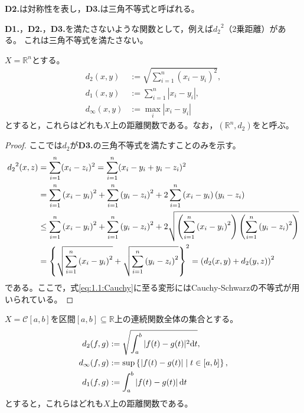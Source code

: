 \documentclass[uplatex]{jsarticle}
\begin{document}
{\bf D2.}は対称性を表し，{\bf D3.}は三角不等式と呼ばれる。

{\bf D1.}，{\bf D2.}，{\bf D3.}を満たさないような関数として，例えば${d_{2}}^{2}$（2乗距離）がある。
これは三角不等式を満たさない。

\begin{rei}
    $X = \mathbb{R}^{n}$とする。
    \begin{align}
        d_{2} (x,y) &:= \sqrt{\sum_{i=1}^{n} (x_{i} - y_{i})^{2}}, \\
        d_{1} (x,y) &:= \sum_{i=1}^{n} |x_{i} - y_{i}|, \\
        d_{\infty} (x,y) &:= \max_{i} |x_{i} - y_{i}|
    \end{align}
    とすると，これらはどれも$X$上の距離関数である。なお，$(\mathbb{R}^{n}, d_{2})$をと呼ぶ。
\end{rei}
\begin{proof}
    ここでは$d_{2}$が{\bf D3.}の三角不等式を満たすことのみを示す。
    \begin{align}
        {d_{2}}^{2}(x,z)
        &= \sum_{i=1}^{n} (x_{i} - z_{i})^{2} = \sum_{i=1}^{n} (x_{i} - y_{i} + y_{i} - z_{i})^{2} \notag \\
        &= \sum_{i=1}^{n} \left( x_{i} - y_{i} \right)^{2} + \sum_{i=1}^{n} \left( y_{i} - z_{i} \right)^{2} + 2 \sum_{i=1}^{n} \left( x_{i} - y_{i} \right) \left( y_{i} - z_{i} \right) \notag \\
      &\le \sum_{i=1}^{n} \left( x_{i} - y_{i} \right)^{2} + \sum_{i=1}^{n} \left( y_{i} - z_{i} \right)^{2} + 2 \sqrt{\left( \sum_{i=1}^{n} \left( x_{i} - y_{i} \right)^{2} \right) \left( \sum_{i=1}^{n} \left( y_{i} - z_{i} \right)^{2} \right)} \label{eq:1.1:Cauchy}\\
        &= \left\{ \sqrt{\sum_{i=1}^{n} \left( x_{i} - y_{i} \right)^{2}} + \sqrt{\sum_{i=1}^{n} \left( y_{i} - z_{i} \right)^{2}} \right\}^{2}
         = \left( d_{2}(x,y) + d_{2} (y,z) \right)^{2}
    \end{align}
    である。ここで，式\eqref{eq:1.1:Cauchy}に至る変形にはCauchy-Schwarzの不等式が用いられている。
\end{proof}

\begin{rei}
    $X = \mathcal{C} [a,b]$を区間$[a,b] \subseteq \mathbb{R}$上の連続関数全体の集合とする。
    \begin{align}
        d_{2} (f,g) &:= \sqrt{ \int_{a}^{b} | f(t) - g(t) | ^{2} \mathrm{d}t}, \\
        d_{\infty} (f,g) &:= \sup \Set{\hspace{-1.8pt}  \left| f(t) - g(t) \right| | t \in [a,b] \hspace{-1.8pt}}, \\
        d_{1} (f,g) &:= \int_{a}^{b} \left| f(t) - g(t) \right| \mathrm{d}t
    \end{align}
    とすると，これらはどれも$X$上の距離関数である。
\end{rei}
\end{document}
